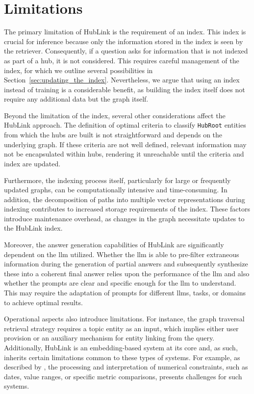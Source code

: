 

\section{Limitations}
\label{sec:hublink_limitations}

The primary limitation of HubLink is the requirement of an index. This index is crucial for inference because only the information stored in the index is seen by the retriever. Consequently, if a question asks for information that is not indexed as part of a hub, it is not considered. This requires careful management of the index, for which we outline several possibilities in Section~\ref{sec:updating_the_index}. Nevertheless, we argue that using an index instead of training is a considerable benefit, as building the index itself does not require any additional data but the graph itself.

Beyond the limitation of the index, several other considerations affect the HubLink approach. The definition of optimal criteria to classify \texttt{HubRoot} entities from which the hubs are built is not straightforward and depends on the underlying graph. If these criteria are not well defined, relevant information may not be encapsulated within hubs, rendering it unreachable until the criteria and index are updated.

Furthermore, the indexing process itself, particularly for large or frequently updated graphs, can be computationally intensive and time-consuming. In addition, the decomposition of paths into multiple vector representations during indexing contributes to increased storage requirements of the index. These factors introduce maintenance overhead, as changes in the graph necessitate updates to the HubLink index.

Moreover, the answer generation capabilities of HubLink are significantly dependent on the \gls{llm} utilized. Whether the \gls{llm} is able to pre-filter extraneous information during the generation of partial answers and subsequently synthesize these into a coherent final answer relies upon the performance of the \gls{llm} and also whether the prompts are clear and specific enough for the \gls{llm} to understand. This may require the adaptation of prompts for different \glspl{llm}, tasks, or domains to achieve optimal results.

Operational aspects also introduce limitations. For instance, the graph traversal retrieval strategy requires a topic entity as an input, which implies either user provision or an auxiliary mechanism for entity linking from the query. Additionally, HubLink is an embedding-based system at its core and, as such, inherits certain limitations common to these types of systems. For example, as described by \textcite{wang_reasoning_2024}, the processing and interpretation of numerical constraints, such as dates, value ranges, or specific metric comparisons, presents challenges for such systems.

